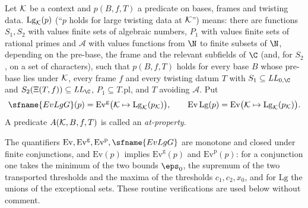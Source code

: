 \begin{definition}\label{pf:bundles:def:large}
Let $\mathcal K$ be a context and $p(B,f,T)$ a predicate on bases, frames and twisting data. $\mathrm{Lg}_\mathcal K(p)$ (``$p$
holds for large twisting data at $\mathcal K$'') means: there are functions $S_1,S_2$ with values finite sets of algebraic
numbers, $P_1$ with values finite sets of rational primes and $\mathcal A$ with values functions from $\N$ to finite subsets
of $\N$, depending on the pre-base, the frame and the relevant subfields of $\C$ (and, for $S_2$, on a set of characters),
such that $p(B,f,T)$ holds for every base $B$ whose pre-base lies under $\mathcal K$, every frame $f$ and every twisting datum $T$
with $S_1\subseteq\mathit{LL}_{0,\C}$ and $S_2(\Xi(T,f))\subseteq\mathit{LL}_\C$, $P_1\subseteq T.\mathrm{pl}$, and $T$
avoiding $\mathcal A$. Put
\[
\sfname{EvLgG}(p)=\mathrm{Ev}^{\mathrm g}\bigl(\bundK\mapsto\mathrm{Lg}_\bundK(p_\bundK)\bigr),\qquad
\mathrm{Ev}\,\mathrm{Lg}(p)=\mathrm{Ev}\bigl(\bundK\mapsto\mathrm{Lg}_\bundK(p_\bundK)\bigr).
\]
A predicate $A(\mathcal K,B,f,T)$ is called an \emph{at-property}.
\end{definition}

\begin{remark}\label{pf:bundles:rem:closure}
The quantifiers $\mathrm{Ev},\mathrm{Ev}^{\mathrm g},\mathrm{Ev}^{\mathrm p},\sfname{EvLgG}$ are monotone and closed under
finite conjunctions, and $\mathrm{Ev}(p)$ implies $\mathrm{Ev}^{\mathrm g}(p)$ and $\mathrm{Ev}^{\mathrm p}(p)$: for a
conjunction one takes the minimum of the two bounds $\eps_0$, the supremum of the two transported thresholds and the maxima
of the thresholds $c_1,c_2,x_0$, and for $\mathrm{Lg}$ the unions of the exceptional sets. These routine verifications are
used below without comment.
\end{remark}

